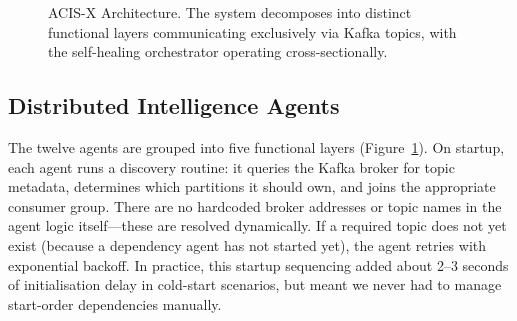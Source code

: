 \documentclass[runningheads]{llncs}
\begin{document}
\begin{figure}[ht]
\centering
{}
\caption{ACIS-X Architecture. The system decomposes into distinct functional layers communicating exclusively via Kafka topics, with the self-healing orchestrator operating cross-sectionally.}
\label{fig:arch}
\end{figure}

\subsection{Distributed Intelligence Agents}
The twelve agents are grouped into five functional layers (Figure~\ref{fig:arch}). On startup, each agent runs a discovery routine: it queries the Kafka broker for topic metadata, determines which partitions it should own, and joins the appropriate consumer group. There are no hardcoded broker addresses or topic names in the agent logic itself---these are resolved dynamically. If a required topic does not yet exist (because a dependency agent has not started yet), the agent retries with exponential backoff. In practice, this startup sequencing added about 2--3 seconds of initialisation delay in cold-start scenarios, but meant we never had to manage start-order dependencies manually.
\end{document}
